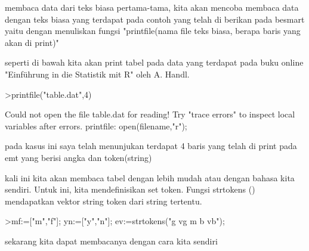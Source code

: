 \documentclass[a4paper,10pt]{article}
\begin{document}
\begin{eulernotebook}
\begin{eulercomment}
\begin{eulercomment}
\begin{eulercomment}
\begin{eulercomment}
\begin{eulercomment}
\begin{eulercomment}
\begin{eulercomment}
\begin{eulercomment}
\begin{eulercomment}
\begin{eulercomment}
\begin{eulercomment}
membaca data dari teks biasa pertama-tama, kita akan mencoba membaca
data dengan teks biasa yang terdapat pada contoh yang telah di berikan
pada besmart yaitu dengan menuliskan fungsi "printfile(nama file teks
biasa, berapa baris yang akan di print)"

seperti di bawah kita akan print tabel pada data yang terdapat pada
buku online "Einführung in die Statistik mit R" oleh A. Handl.
\end{eulercomment}
\begin{eulerprompt}
>printfile("table.dat",4)
\end{eulerprompt}
\begin{euleroutput}
  Could not open the file
  table.dat
  for reading!
  Try "trace errors" to inspect local variables after errors.
  printfile:
      open(filename,"r");
\end{euleroutput}
\begin{eulercomment}
pada kasus ini saya telah menunjukan terdapat 4 baris yang telah di
print pada emt yang berisi angka dan token(string)

kali ini kita akan membaca tabel dengan lebih mudah atau dengan bahasa
kita sendiri. Untuk ini, kita mendefinisikan set token. Fungsi
strtokens () mendapatkan vektor string token dari string tertentu.
\end{eulercomment}
\begin{eulerprompt}
>mf:=["m","f"]; yn:=["y","n"]; ev:=strtokens("g vg m b vb");
\end{eulerprompt}
\begin{eulercomment}
sekarang kita dapat membacanya dengan cara kita sendiri


\end{eulercomment}
\end{eulercomment}
\end{eulercomment}
\end{eulercomment}
\end{eulercomment}
\end{eulercomment}
\end{eulercomment}
\end{eulercomment}
\end{eulercomment}
\end{eulercomment}
\end{eulercomment}
\end{eulernotebook}
\end{document}
